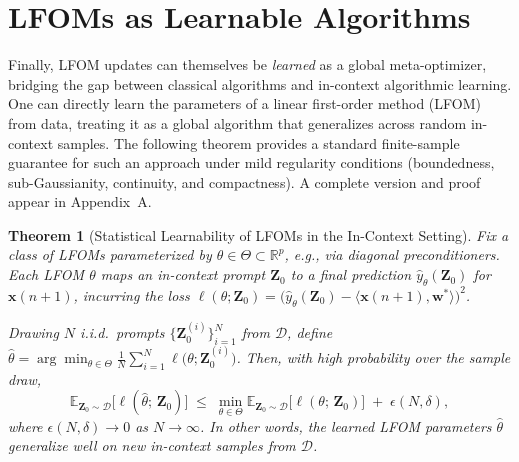 \documentclass[11pt]{article}
\theoremstyle{plain}
\newtheorem{theorem}{Theorem}[section]
\theoremstyle{definition}
\theoremstyle{remark}
\numberwithin{equation}{section}
\begin{document}
\section{LFOMs as Learnable Algorithms}
\label{sec:LFOMs_statistical_learning}
Finally, LFOM updates can themselves be \emph{learned} as a global meta-optimizer, bridging the gap between classical algorithms and in-context algorithmic learning. One can directly learn the parameters of a linear first-order method (LFOM) from data, treating it as a global algorithm that generalizes across random in-context samples. The following theorem provides a standard finite-sample guarantee for such an approach under mild regularity conditions (boundedness, sub-Gaussianity, continuity, and compactness). A complete version and proof appear in Appendix~A.
\begin{theorem}[Statistical Learnability of LFOMs in the In-Context Setting]
\label{thm:lfom_incontext_learnable}
Fix a class of LFOMs parameterized by $\theta\in\Theta\subset\mathbb{R}^p$, e.g., via diagonal preconditioners. Each LFOM $\theta$ maps an in-context prompt $\mathbf{Z}_0$ to a final prediction $\hat{y}_{\theta}(\mathbf{Z}_0)$ for $\mathbf{x}(n+1)$, incurring the loss $\ell(\theta; \mathbf{Z}_0) = \bigl(\hat{y}_\theta(\mathbf{Z}_0) - \langle \mathbf{x}(n+1), \mathbf{w}^*\rangle\bigr)^2$. 

Drawing $N$ i.i.d.\ prompts $\{\mathbf{Z}_0^{(i)}\}_{i=1}^N$ from $\mathcal{D}$, define $\widehat{\theta} = \arg\min_{\theta\in\Theta} \frac{1}{N}\sum_{i=1}^N \ell\bigl(\theta; \mathbf{Z}_0^{(i)}\bigr)$. Then, with high probability over the sample draw, 
\[
    \mathbb{E}_{\mathbf{Z}_0\sim\mathcal{D}}\bigl[\ell(\widehat{\theta};\,\mathbf{Z}_0)\bigr]
    \;\le\;
    \min_{\theta\in\Theta}
    \mathbb{E}_{\mathbf{Z}_0\sim\mathcal{D}}\bigl[\ell(\theta;\,\mathbf{Z}_0)\bigr]
    \;+\;\epsilon(N,\delta),
\]
where $\epsilon(N,\delta) \to 0$ as $N\to\infty$. In other words, the learned LFOM parameters $\widehat{\theta}$ generalize well on new in-context samples from $\mathcal{D}$.
\end{theorem}
\end{document}
